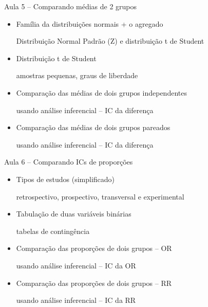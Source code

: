 \documentclass{beamer}
\begin{document}
\begin{frame}{\scriptsize Aula 5 -- Comparando médias de 2 grupos}
  \begin{itemize}
    \footnotesize
  \item Família da distribuições normais + o agregado

    {\tiny Distribuição Normal Padrão (Z) e distribuição t de Student}
    \bigskip
  \item Distribuição t de Student

    {\tiny amostras pequenas, graus de liberdade}
    \bigskip
  \item Comparação das médias de dois grupos independentes

    {\tiny usando análise inferencial -- IC da diferença}
    \bigskip
  \item Comparação das médias de dois grupos pareados

    {\tiny usando análise inferencial -- IC da diferença}
  \end{itemize}
\end{frame}

\begin{frame}{\scriptsize Aula 6 -- Comparando ICs de proporções}
  \begin{itemize}
    \footnotesize
  \item Tipos de estudos (simplificado)

    {\tiny retrospectivo, prospectivo, transversal e experimental}
    \bigskip
  \item Tabulação de duas variáveis binárias

    {\tiny tabelas de contingência}
    \bigskip
  \item Comparação das proporções de dois grupos -- OR

    {\tiny usando análise inferencial -- IC da OR}
    \bigskip
  \item Comparação das proporções de dois grupos -- RR

    {\tiny usando análise inferencial -- IC da RR}
  \end{itemize}
\end{frame}
\end{document}
